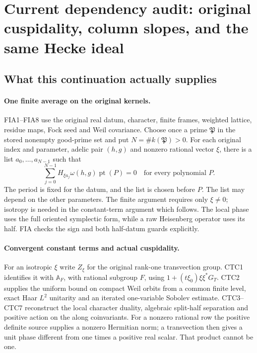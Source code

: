 \section{Current dependency audit: original cuspidality, column slopes, and the same Hecke ideal}
\label{sec:dependency-audit-v33}


\subsection{What this continuation actually supplies}

\paragraph{One finite average on the original kernels.}
FIA1--FIA8 use the original real datum, character, finite frames,
weighted lattice, residue maps, Fock seed and Weil covariance.
Choose once a prime $\mathfrak P$ in the stored nonempty good-prime
set and put $N=\#k(\mathfrak P)>0$. For each original index and
parameter, adelic pair $(h,g)$ and nonzero rational vector $\xi$,
there is a list $a_0,\ldots,a_{N-1}$ such that
\[
 \sum_{j=0}^{N-1}H_{\xi a_j}\omega(h,g)\operatorname{pt}(P)=0
                         \quad\text{for every polynomial }P.
 \tag{AU33.1}
\]
The period is fixed for the datum, and the list is chosen before
$P$. The list may depend on the other parameters. The finite
argument requires only $\xi\ne0$; isotropy is needed in the
constant-term argument which follows. The local phase uses the full
oriented symplectic form, while a raw Heisenberg operator uses its
half. FIA checks the sign and both half-datum guards explicitly.

\paragraph{Convergent constant terms and actual cuspidality.}
For an isotropic $\xi$ write $Z_\xi$ for the original rank-one
transvection group. CTC1 identifies it with $\mathbb A_F$, with
rational subgroup $F$, using $1+(t\xi_0)\xi\xi^*G_T$.
CTC2 supplies the uniform bound on compact Weil orbits from a
common finite level, exact Haar $L^2$ unitarity and an iterated
one-variable Sobolev estimate. CTC3--CTC7 reconstruct the local
character duality, algebraic split-half separation and positive
action on the along coinvariants. For a nonzero rational row the
positive definite source supplies a nonzero Hermitian norm; a
transvection then gives a unit phase different from one times a
positive real scalar. That product cannot be one.

